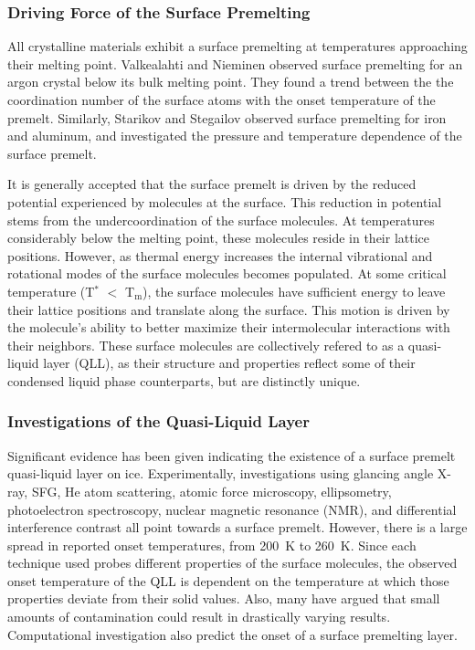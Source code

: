 \subsubsection{Driving Force of the Surface Premelting}
All crystalline materials exhibit a surface premelting at temperatures
approaching their melting point. Valkealahti and Nieminen observed
surface premelting for an argon crystal below its bulk melting
point.\cite{Valkealahti1987} They found a trend between the the
coordination number of the surface atoms with the onset temperature of
the premelt. Similarly, Starikov and Stegailov observed surface
premelting for iron and aluminum, and investigated the pressure and
temperature dependence of the surface premelt.\cite{Starikov2009}

It is generally accepted that the surface premelt is driven by the
reduced potential experienced by molecules at the surface. This
reduction in potential stems from the undercoordination of the surface
molecules.  At temperatures considerably below the melting point,
these molecules reside in their lattice positions. However, as thermal
energy increases the internal vibrational and rotational modes of the
surface molecules becomes populated. At some critical temperature
(T$^\mathrm{*}$ $<$ T$_\mathrm{m}$), the surface molecules have
sufficient energy to leave their lattice positions and translate along
the surface. This motion is driven by the molecule's ability
to better maximize their intermolecular interactions with their
neighbors. These surface molecules are collectively refered to as a
quasi-liquid layer (QLL), as their structure and properties reflect
some of their condensed liquid phase counterparts, but are distinctly
unique.

\subsubsection{Investigations of the Quasi-Liquid Layer}
Significant evidence has been given indicating the existence of a
surface premelt quasi-liquid layer on ice. Experimentally,
investigations using glancing angle X-ray\cite{Lied1994, Dosch1995},
SFG\cite{Wei2001}, He atom scattering\cite{Suter2006}, atomic force
microscopy\cite{Goertz2009,Doppenschmidt2000},
ellipsometry\cite{Furukawa1997}, photoelectron
spectroscopy\cite{Bluhm2002}, nuclear magnetic resonance
(NMR)\cite{Dec2009,Dec2012}, and differential interference
contrast\cite{Sazaki2012,Asakawa2016,Sazaki2013} all point towards a
surface premelt. However, there is a large spread in reported onset
temperatures, from 200~K to 260~K. Since each technique used probes
different properties of the surface molecules, the observed onset
temperature of the QLL is dependent on the temperature at which those
properties deviate from their solid values. Also, many have argued
that small amounts of contamination could result in drastically
varying results.\cite{Elbaum1993,Wettlaufer1999} Computational
investigation also predict the onset of a surface premelting
layer.\cite{Conde2008,Neshyba2009,Gladich2011,Pfalzgraff2011,Gladich2015,Park2010,Shepherd2012,Limmer2014,Persson2015}


